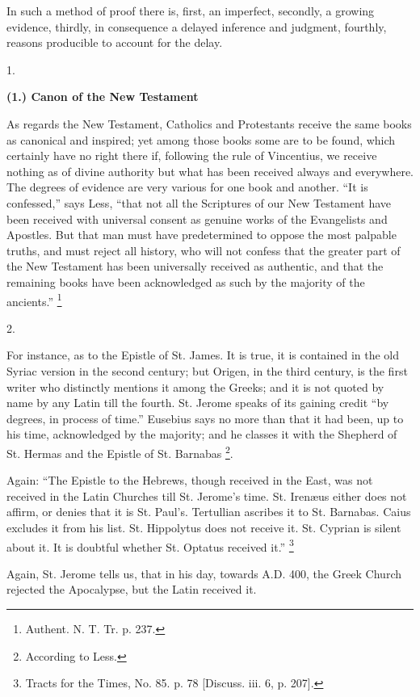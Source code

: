 In such a method of proof there is, first, an
imperfect, secondly, a growing evidence, thirdly, in
consequence a delayed inference and judgment, fourthly,
reasons producible to account for the delay.


1.

\textbf{(1.) Canon of the New Testament}

As regards the New Testament, Catholics and Protestants receive the same books as canonical and inspired; yet
among those books some are to be found, which certainly
have no right there if, following the rule of Vincentius,
we receive nothing as of divine authority but what has
been received always and everywhere. The degrees of
evidence are very various for one book and another.
``It is confessed,'' says Less, ``that not
all the Scriptures of our New Testament have been
received with universal consent as genuine works of the
Evangelists and Apostles. But that man must have
predetermined to oppose the most palpable truths, and
must reject all history, who will not confess that the
greater part of the New Testament has been universally
received as authentic, and that the remaining books have
been acknowledged as such by the majority of the
ancients.'' \footnote{Authent. N. T. Tr. p. 237.}

2.

For instance, as to the Epistle of St. James. It is
true, it is contained in the old Syriac version in the
second century; but Origen, in the third century, is the
first writer who distinctly mentions it among the Greeks;
and it is not quoted by name by any Latin till the
fourth. St. Jerome speaks of its gaining credit ``by
degrees, in process of time.'' Eusebius says no more
than that it had been, up to his time, acknowledged by
the majority; and he classes it with the Shepherd of St.
Hermas and the Epistle of St. Barnabas \footnote{According to Less.}.

Again: ``The Epistle to the Hebrews, though
received in the East, was not received in the Latin
Churches till St. Jerome's time. St. Irenæus either does
not affirm, or denies that it is St. Paul's. Tertullian
ascribes it to St. Barnabas. Caius excludes it from his
list. St. Hippolytus does not receive it. St. Cyprian is
silent about it. It is doubtful whether St. Optatus
received it.'' \footnote{Tracts for the Times, No. 85.
p. 78 [Discuss. iii. 6, p. 207].}

Again, St. Jerome tells us, that in his day, towards A.D. 400, the Greek Church rejected the Apocalypse, but
the Latin received it.


